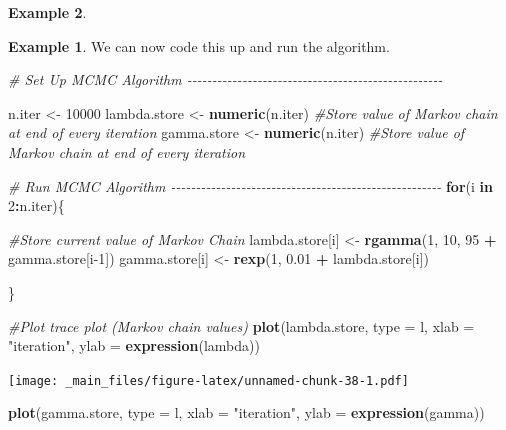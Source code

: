 \documentclass[
]{book}
\newenvironment{Shaded}{\begin{snugshade}}{\end{snugshade}}
\newcommand{\AttributeTok}[1]{\textcolor[rgb]{0.13,0.29,0.53}{#1}}
\newcommand{\CommentTok}[1]{\textcolor[rgb]{0.56,0.35,0.01}{\textit{#1}}}
\newcommand{\ControlFlowTok}[1]{\textcolor[rgb]{0.13,0.29,0.53}{\textbf{#1}}}
\newcommand{\DecValTok}[1]{\textcolor[rgb]{0.00,0.00,0.81}{#1}}
\newcommand{\FloatTok}[1]{\textcolor[rgb]{0.00,0.00,0.81}{#1}}
\newcommand{\FunctionTok}[1]{\textcolor[rgb]{0.13,0.29,0.53}{\textbf{#1}}}
\newcommand{\NormalTok}[1]{#1}
\newcommand{\OtherTok}[1]{\textcolor[rgb]{0.56,0.35,0.01}{#1}}
\newcommand{\SpecialCharTok}[1]{\textcolor[rgb]{0.81,0.36,0.00}{\textbf{#1}}}
\newcommand{\StringTok}[1]{\textcolor[rgb]{0.31,0.60,0.02}{#1}}
\theoremstyle{definition}
\theoremstyle{definition}
\newtheorem{example}{Example}[chapter]
\theoremstyle{definition}
\theoremstyle{definition}
\theoremstyle{remark}
\begin{document}
\begin{example}
\begin{example}
We can now code this up and run the algorithm.

\begin{Shaded}
\begin{Highlighting}[]
\CommentTok{\# Set Up MCMC Algorithm {-}{-}{-}{-}{-}{-}{-}{-}{-}{-}{-}{-}{-}{-}{-}{-}{-}{-}{-}{-}{-}{-}{-}{-}{-}{-}{-}{-}{-}{-}{-}{-}{-}{-}{-}{-}{-}{-}{-}{-}{-}{-}{-}{-}{-}{-}{-}{-}{-}{-}{-}}

\NormalTok{n.iter }\OtherTok{\textless{}{-}} \DecValTok{10000}
\NormalTok{lambda.store }\OtherTok{\textless{}{-}} \FunctionTok{numeric}\NormalTok{(n.iter) }\CommentTok{\#Store value of Markov chain at end of every iteration}
\NormalTok{gamma.store }\OtherTok{\textless{}{-}} \FunctionTok{numeric}\NormalTok{(n.iter) }\CommentTok{\#Store value of Markov chain at end of every iteration}



\CommentTok{\# Run MCMC Algorithm {-}{-}{-}{-}{-}{-}{-}{-}{-}{-}{-}{-}{-}{-}{-}{-}{-}{-}{-}{-}{-}{-}{-}{-}{-}{-}{-}{-}{-}{-}{-}{-}{-}{-}{-}{-}{-}{-}{-}{-}{-}{-}{-}{-}{-}{-}{-}{-}{-}{-}{-}{-}{-}{-}}
\ControlFlowTok{for}\NormalTok{(i }\ControlFlowTok{in} \DecValTok{2}\SpecialCharTok{:}\NormalTok{n.iter)\{}
  
  \CommentTok{\#Store current value of Markov Chain}
\NormalTok{  lambda.store[i] }\OtherTok{\textless{}{-}} \FunctionTok{rgamma}\NormalTok{(}\DecValTok{1}\NormalTok{, }\DecValTok{10}\NormalTok{, }\DecValTok{95} \SpecialCharTok{+}\NormalTok{ gamma.store[i}\DecValTok{{-}1}\NormalTok{])}
\NormalTok{  gamma.store[i]  }\OtherTok{\textless{}{-}} \FunctionTok{rexp}\NormalTok{(}\DecValTok{1}\NormalTok{, }\FloatTok{0.01} \SpecialCharTok{+}\NormalTok{ lambda.store[i])}
  
\NormalTok{\}}

\CommentTok{\#Plot trace plot (Markov chain values)}
\FunctionTok{plot}\NormalTok{(lambda.store, }\AttributeTok{type =} \StringTok{\textquotesingle{}l\textquotesingle{}}\NormalTok{, }\AttributeTok{xlab =} \StringTok{"iteration"}\NormalTok{, }\AttributeTok{ylab =} \FunctionTok{expression}\NormalTok{(lambda))}
\end{Highlighting}
\end{Shaded}

\texttt{[image: \_main\_files/figure-latex/unnamed-chunk-38-1.pdf]}

\begin{Shaded}
\begin{Highlighting}[]
\FunctionTok{plot}\NormalTok{(gamma.store, }\AttributeTok{type =} \StringTok{\textquotesingle{}l\textquotesingle{}}\NormalTok{, }\AttributeTok{xlab =} \StringTok{"iteration"}\NormalTok{, }\AttributeTok{ylab =} \FunctionTok{expression}\NormalTok{(gamma))}
\end{Highlighting}
\end{Shaded}


\end{example}
\end{example}
\end{document}
